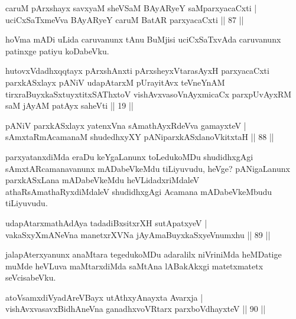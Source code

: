 
\begin{shl}
caruM pArxshayx savxyaM sheVSaM BAyARyeY saMparxyacaCxti | \\
uciCxSaTxmeVva BAyARyeY caruM BatAR parxyacaCxti \hfill|| 87 || 
\end{shl}

\begin{artha}
hoVma mADi uLida caruvanunx tAnu BuMjisi uciCxSaTxvAda caruvanunx 
patinxge patiyu koDabeVku.
\end{artha}

\begin{shl}
hutovxVdadhxqqtayx pArxshAnxti pArxsheyxVtarasAyxH parxyacaCxti parxkASxlayx pANiV udapAtarxM pUrayitAvx teVneYnAM tirxraBuyxkaSxtuyxtitxSAThxtoV vishAvxvasoV\s nAyxmicaCx parxpUvAyxRM saM jAyAM patAyx saheVti || 19 ||
\end{shl}

\begin{shl}
pANiV parxkASxlayx yatenxVna sAmathAyxRdeVva gamayxteV | \\
sAmxtaRmAcamanaM shudedhxyXY pANiparxkASxlanoVkitxtaH \hfill|| 88 || 
\end{shl}

\begin{artha}
parxyatanxdiMda eraDu keYgaLanunx toLedukoMDu shudidhxgAgi 
sAmxtARcamanavanunx mADabeVkeMdu tiLiyuvudu, heVge? pANigaLanunx 
parxkASxLana mADabeVkeMdu heVLidadxriMdaleV athaRsAmathaRyxdiMdaleV
shudidhxgAgi Acamana mADabeVkeMbudu tiLiyuvudu.
\end{artha}


\begin{shl}
udapAtarxmathA\s \s dAya tadadiBxsitxrXH sutApatxyeV | \\
vakaSxyXmANeVna manetxrXVNa jAyAmaBuyxkaSxyeVnumxhu \hfill|| 89 || 
\end{shl}

\begin{artha}
jalapAterxyanunx anaMtara tegedukoMDu adaralilx niVriniMda heMDatige muMde heVLuva maMtarxdiMda saMtAna lABakAkxgi matetxmatetx seVcisabeVku.
\end{artha}


\begin{shl}
atoV\s samxdiVyadAreVBayx utAthxyAnayxta Avarxja | \\
vishAvxvasavxBidhAneVna ganadhxvoVR\s tarx parxboVdhayxteV \hfill|| 90 || 
\end{shl}

